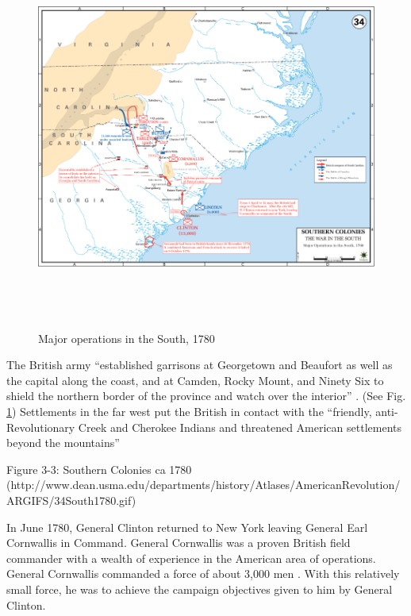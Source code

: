 \begin{figure}[h]
\begin{center}
\includegraphics[height=5in]{gfx/Nicholson3}
\end{center}
\caption{Major operations in the South, 1780 \cite[Map 34]{web:USMA:map34}}
\label{Nicholson3}
\end{figure}

The British army “established garrisons at Georgetown and Beaufort as well as
the capital along the coast, and at Camden, Rocky Mount, and Ninety Six to
shield the northern border of the province and watch over the interior”
\cite[p.10]{weigley_partisan_1970}.  (See Fig. \ref{Nicholson3}) Settlements in
the far west put the British in contact with the “friendly, anti-Revolutionary
Creek and Cherokee Indians and threatened American settlements beyond the
mountains” \cite[p.10]{weigley_partisan_1970}

Figure 3-3: Southern Colonies ca 1780
(http://www.dean.usma.edu/departments/history/Atlases/AmericanRevolution/ARGIFS/34South1780.gif)



In June 1780, General Clinton returned to New York leaving General Earl
Cornwallis in Command.  General Cornwallis was a proven British field commander
with a wealth of experience in the American area of operations.  General
Cornwallis commanded a force of about 3,000 men
\cite[p.51]{woodward_comparative_2002}.  With this
relatively small force, he was to achieve the campaign objectives given to him
by General Clinton.  

